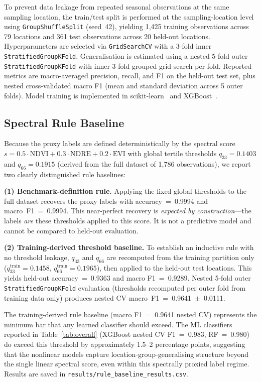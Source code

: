 \documentclass[conference]{IEEEtran}
\begin{document}
To prevent data leakage from repeated seasonal observations at the same
sampling location, the train/test split is performed at the sampling-location
level using \texttt{GroupShuffleSplit} (seed~42), yielding 1,425 training
observations across 79 locations and 361 test observations across 20 held-out
locations. Hyperparameters are selected via \texttt{GridSearchCV} with a 3-fold
inner \texttt{StratifiedGroupKFold}. Generalisation is estimated using a nested
5-fold outer \texttt{StratifiedGroupKFold} with inner 3-fold grouped grid search
per fold. Reported metrics are macro-averaged precision, recall, and F1 on the
held-out test set, plus nested cross-validated macro F1 (mean and standard
deviation across 5 outer folds). Model training is implemented in
scikit-learn~\cite{sklearn} and XGBoost~\cite{chen2016xgboost}.

\subsection{Spectral Rule Baseline}
\label{sec:rule_baseline}

Because the proxy labels are defined deterministically by the spectral score
$s = 0.5{\cdot}\text{NDVI} + 0.3{\cdot}\text{NDRE} + 0.2{\cdot}\text{EVI}$
with global tertile thresholds $q_{33}{=}0.1403$ and $q_{66}{=}0.1915$
(derived from the full dataset of 1,786 observations), we report two clearly
distinguished rule baselines:

\textbf{(1) Benchmark-definition rule.} Applying the fixed global thresholds
to the full dataset recovers the proxy labels with accuracy~=~0.9994 and
macro~F1~=~0.9994. This near-perfect recovery is \textit{expected by
construction}—the labels \textit{are} these thresholds applied to this score.
It is not a predictive model and cannot be compared to held-out evaluation.

\textbf{(2) Training-derived threshold baseline.} To establish an inductive
rule with no threshold leakage, $q_{33}$ and $q_{66}$ are recomputed from the
training partition only ($q_{33}^{\text{train}}{=}0.1458$,
$q_{66}^{\text{train}}{=}0.1965$), then applied to the held-out test
locations. This yields held-out accuracy~=~0.9363 and macro
F1~=~0.9289. Nested 5-fold outer \texttt{StratifiedGroupKFold} evaluation
(thresholds recomputed per outer fold from training data only) produces nested
CV macro~F1~=~0.9641~$\pm$~0.0111.

The training-derived rule baseline (macro F1~=~0.9641 nested CV) represents
the minimum bar that any learned classifier should exceed. The ML classifiers
reported in Table~\ref{tab:overall} (XGBoost nested CV F1~=~0.983, RF~=~0.980)
do exceed this threshold by approximately 1.5--2 percentage points, suggesting
that the nonlinear models capture location-group-generalising structure beyond
the single linear spectral score, even within this spectrally proxied label
regime. Results are saved in \texttt{results/rule\_baseline\_results.csv}.
\end{document}
